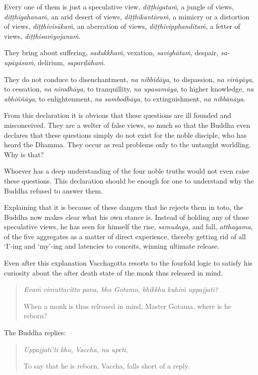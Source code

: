 Every one of them is just a speculative view, \emph{diṭṭhigataṁ}, a jungle of views, \emph{diṭṭhigahanaṁ}, an arid desert of views, \emph{diṭṭhikantāraṁ}, a mimicry or a distortion of views, \emph{diṭṭhivisūkaṁ}, an aberration of views, \emph{diṭṭhivipphanditaṁ}, a fetter of views, \emph{diṭṭhisaṁyojanaṁ}.

They bring about suffering, \emph{sadukkhaṁ}, vexation, \emph{savighātaṁ}, despair, \emph{sa-upāyāsaṁ}, delirium, \emph{sapariḷāhaṁ}.

They do not conduce to disenchantment, \emph{na nibbidāya}, to dispassion, \emph{na virāgāya}, to cessation, \emph{na nirodhāya}, to tranquillity, \emph{na upasamāya}, to higher knowledge, \emph{na abhiññāya}, to enlightenment, \emph{na sambodhāya}, to extinguishment, \emph{na nibbānāya}.

From this declaration it is obvious that these questions are ill founded and misconceived. They are a welter of false views, so much so that the Buddha even declares that these questions simply do not exist for the noble disciple, who has heard the Dhamma. They occur as real problems only to the untaught worldling. Why is that?

Whoever has a deep understanding of the four noble truths would not even raise these questions. This declaration should be enough for one to understand why the Buddha refused to answer them.

Explaining that it is because of these dangers that he rejects them in toto, the Buddha now makes clear what his own stance is. Instead of holding any of those speculative views, he has seen for himself the rise, \emph{samudaya}, and fall, \emph{atthagama}, of the five aggregates as a matter of direct experience, thereby getting rid of all `I'-ing and `my'-ing and latencies to conceits, winning ultimate release.

Even after this explanation Vacchagotta resorts to the fourfold logic to satisfy his curiosity about the after death state of the monk thus released in mind.

\begin{quote}
\emph{Evaṁ vimuttacitto pana, bho Gotamo, bhikkhu kuhiṁ uppajjati?}

When a monk is thus released in mind, Master Gotama, where is he reborn?
\end{quote}

The Buddha replies:

\begin{quote}
\emph{Uppajjatī'ti kho, Vaccha, na upeti},

To say that he is reborn, Vaccha, falls short of a reply.
\end{quote}

